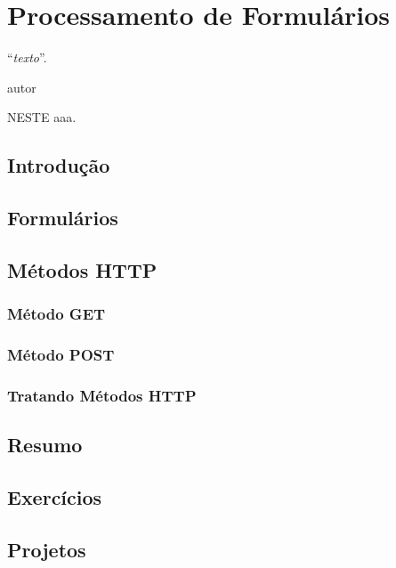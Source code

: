 \chapter{Processamento de Formulários}
\epigraph{``\textit{texto}''.}{autor}

\lettrine[lines=4, lhang=0.1, lraise=0, loversize=0.2, findent=0.1em]{\textcolor{corAzulTema}{N}}{ESTE} aaa.

\section{Introdução}

\section{Formulários}

\section{Métodos HTTP}

\subsection{Método GET}

\subsection{Método POST}

\subsection{Tratando Métodos HTTP}

\section{Resumo}

\section{Exercícios}

\section{Projetos}